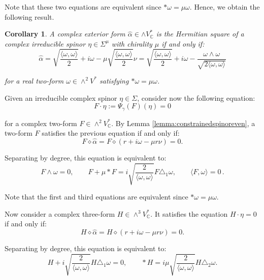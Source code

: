 \documentclass[10pt,a4paper,twoside,reqno]{amsart}
\theoremstyle{plain}
\newtheorem{cor}[thm]{Corollary}
\theoremstyle{definition}
\theoremstyle{remark}
\def\C{\mathbb{C}}
\newcommand{\escal}[1]{\langle#1\rangle}
\begin{document}
\noindent
Note that these two equations are equivalent since $*\omega=\mu\omega$. Hence, we obtain the following result.

\begin{cor}
\label{cor:Hermitian4d}
A complex exterior form $\widehat{\alpha} \in\wedge V^*_\C$ is the Hermitian square of a complex irreducible spinor $\eta\in\Sigma^{\mu}$ with chirality $\mu$ if and only if:
\begin{equation*}
\widehat{\alpha} =   \sqrt{\frac{ \escal{\omega,\omega}}{2}} + i\omega-\mu  \sqrt{\frac{ \escal{\omega,\omega}}{2}} \nu =  \sqrt{\frac{ \escal{\omega,\omega}}{2}} + i\omega - \frac{\omega\wedge \omega}{\sqrt{2\escal{\omega,\omega}}}  
\end{equation*}

\noindent
for a real two-form $\omega\in\wedge^2V^*$ satisfying $\ast \omega=\mu\omega$.
\end{cor}

Given an irreducible complex spinor $\eta\in \Sigma$, consider now the following equation:
\begin{equation*}
F\cdot \eta := \Psi_{\gamma}(F)(\eta) = 0
\end{equation*}

\noindent
for a complex two-form $F\in \wedge^2 V_\C^{\ast}$. By Lemma \ref{lemma:constrainedspinoreven}, a two-form $F$ satisfies the previous equation if and only if: 
\begin{equation*}
 F\diamond\widehat{\alpha}=F\diamond(r+i\omega-\mu r\nu)=0.   
\end{equation*} 

\noindent
Separating by degree, this equation is equivalent to:
\begin{equation*}
F\wedge\omega=0,\qquad    F+\mu \ast F = i \sqrt{\frac{2}{ \escal{\omega,\omega}}} F\triangle_1\omega ,\qquad \escal{F,\omega}=0\, .    
\end{equation*}

\noindent
Note that the first and third equations are equivalent since $*\omega=\mu\omega$.\medskip

Now consider a complex three-form $H\in\wedge^3V_\C^*$. It satisfies the equation $H\cdot\eta=0$ if and only if: $$H\diamond\widehat{\alpha}=H\diamond(r+i\omega-\mu r\nu)=0.$$

Separating by degree, this equation is equivalent to:  
\begin{equation*}
H+i \sqrt{\frac{2}{ \escal{\omega,\omega}}}  H\triangle_1\omega=0,\qquad \ast H = i  \mu \sqrt{\frac{2}{ \escal{\omega,\omega}}} H\triangle_2\omega.
\end{equation*}
\end{document}
